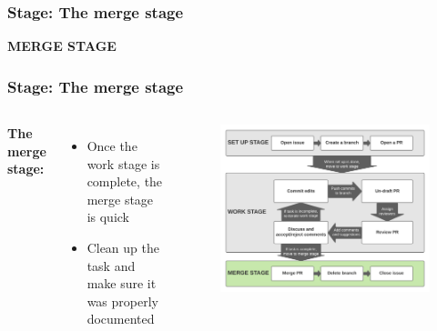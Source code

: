 \documentclass[aspectratio=169]{beamer} %
\begin{document}
\begin{frame}
	\frametitle{Stage: The merge stage}
	
	\huge\centering \textbf{MERGE STAGE}
	
\end{frame}

\begin{frame}
	\frametitle{Stage: The merge stage}
	\begin{columns}[c]
		
		
		\Large \textbf{The merge stage:}
		\vspace{1em}
		\normalsize
		\begin{itemize}
			\setlength\itemsep{.5em}
			\item Once the work stage is complete, the merge stage is quick
			\item Clean up the task and make sure it was properly documented
		\end{itemize}
		
		\vspace{-.75cm}
		\begin{figure}
			\centering
			\includegraphics[width=\textwidth]{./img/branch-pr-merge-cycle-S3.png}
		\end{figure}
		
	\end{columns}
\end{frame}
\end{document}
